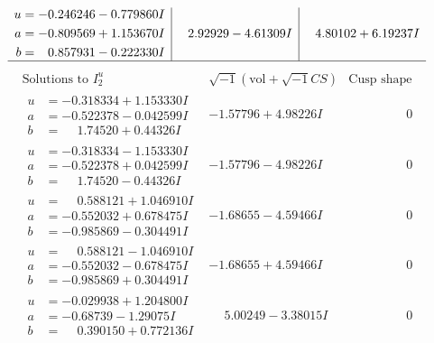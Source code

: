 \documentclass[1p]{elsarticle_modified}
\theoremstyle{definition}
\newcommand{\I}{\sqrt{-1}}
\begin{document}
$$\begin{array}{c|c|c}
\begin{aligned}
u &= -0.246246 - 0.779860 I \\
a &= -0.809569 + 1.153670 I \\
b &= \phantom{-}0.857931 - 0.222330 I\end{aligned}
 & \phantom{-}2.92929 - 4.61309 I & \phantom{-}4.80102 + 6.19237 I\\
 \hline 
 \end{array}$$\newpage$$\begin{array}{c|c|c}  
\text{Solutions to }I^u_{2}& \I (\text{vol} + \sqrt{-1}CS) & \text{Cusp shape}\\
 \hline 
\begin{aligned}
u &= -0.318334 + 1.153330 I \\
a &= -0.522378 - 0.042599 I \\
b &= \phantom{-}1.74520 + 0.44326 I\end{aligned}
 & -1.57796 + 4.98226 I & \phantom{-0.000000 } 0 \\ \hline\begin{aligned}
u &= -0.318334 - 1.153330 I \\
a &= -0.522378 + 0.042599 I \\
b &= \phantom{-}1.74520 - 0.44326 I\end{aligned}
 & -1.57796 - 4.98226 I & \phantom{-0.000000 } 0 \\ \hline\begin{aligned}
u &= \phantom{-}0.588121 + 1.046910 I \\
a &= -0.552032 + 0.678475 I \\
b &= -0.985869 - 0.304491 I\end{aligned}
 & -1.68655 - 4.59466 I & \phantom{-0.000000 } 0 \\ \hline\begin{aligned}
u &= \phantom{-}0.588121 - 1.046910 I \\
a &= -0.552032 - 0.678475 I \\
b &= -0.985869 + 0.304491 I\end{aligned}
 & -1.68655 + 4.59466 I & \phantom{-0.000000 } 0 \\ \hline\begin{aligned}
u &= -0.029938 + 1.204800 I \\
a &= -0.68739 - 1.29075 I \\
b &= \phantom{-}0.390150 + 0.772136 I\end{aligned}
 & \phantom{-}5.00249 - 3.38015 I & \phantom{-0.000000 } 0 \\ \hline\begin{aligned}

\end{aligned}
\end{array}$$
\end{document}
